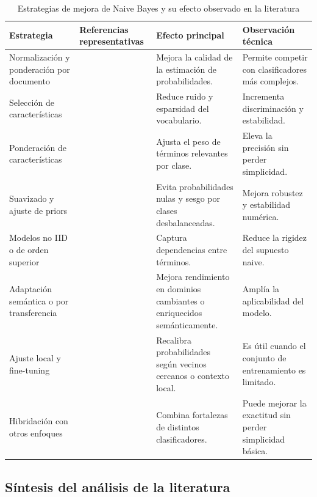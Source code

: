 \begin{table}[htbp]
\centering
\caption{Estrategias de mejora de Naive Bayes y su efecto observado en la literatura}
\label{tab:mejoras}
\begin{tabular}{|p{4.1cm}|p{3.4cm}|p{4.0cm}|p{4.0cm}|}
\hline
\textbf{Estrategia} & \textbf{Referencias representativas} & \textbf{Efecto principal} & \textbf{Observación técnica} \\
\hline
Normalización y ponderación por documento & \cite{Kim2006,Kibriya2005} & Mejora la calidad de la estimación de probabilidades. & Permite competir con clasificadores más complejos. \\
\hline
Selección de características & \cite{CHEN20095432,YOUN2009477,Tang20162508,FENG2015109} & Reduce ruido y esparsidad del vocabulario. & Incrementa discriminación y estabilidad. \\
\hline
Ponderación de características & \cite{Jiang2016,ZHANG2016137,Ruan202020151} & Ajusta el peso de términos relevantes por clase. & Eleva la precisión sin perder simplicidad. \\
\hline
Suavizado y ajuste de priors & \cite{Frank2006,10.1007/978-3-540-71496-5_73} & Evita probabilidades nulas y sesgo por clases desbalanceadas. & Mejora robustez y estabilidad numérica. \\
\hline
Modelos no IID o de orden superior & \cite{Ganiz20111022,4554061,Gan2021} & Captura dependencias entre términos. & Reduce la rigidez del supuesto naive. \\
\hline
Adaptación semántica o por transferencia & \cite{KIM2018128,10.5555/1619645.1619732} & Mejora rendimiento en dominios cambiantes o enriquecidos semánticamente. & Amplía la aplicabilidad del modelo. \\
\hline
Ajuste local y fine-tuning & \cite{ELHINDI2020106652} & Recalibra probabilidades según vecinos cercanos o contexto local. & Es útil cuando el conjunto de entrenamiento es limitado. \\
\hline
Hibridación con otros enfoques & \cite{LU2010598,Awotunde2023131} & Combina fortalezas de distintos clasificadores. & Puede mejorar la exactitud sin perder simplicidad básica. \\
\hline
\end{tabular}
\end{table}

\subsection{Síntesis del análisis de la literatura}

